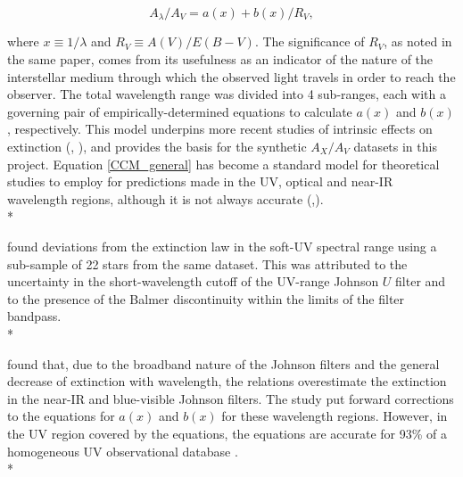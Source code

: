 \documentclass[12pt, a4paper]{report}
\begin{document}
\begin{equation}
A_{\lambda}/A_{V} = a(x) + b(x)/R_{V},
\label{CCM_general}
\end{equation}

where $x \equiv 1/\lambda$ and $R_{V} \equiv A(V)/E(B-V)$. The significance of $R_{V}$, as noted in the same paper, comes from its usefulness as an indicator of the nature of the interstellar medium through which the observed light travels in order to reach the observer. The total wavelength range was divided into 4 sub-ranges, each with a governing pair of empirically-determined equations to calculate $a(x)$ and $b(x)$, respectively. This model underpins more recent studies of intrinsic effects on extinction (\cite{2008PASP..120..583G}, \cite{2018MNRAS.479L.102C}), and provides the basis for the synthetic $A_{X}/A_{V}$ datasets in this project. Equation \ref{CCM_general} has become a standard model for theoretical studies to employ for predictions made in the UV, optical and near-IR wavelength regions, although it is not always accurate (\cite{1994ApJ...422..158O},\cite{1999PASP..111...63F}). \\*

\cite{1994ApJ...422..158O} found deviations from the \cite{1985ApJ...288..618R} extinction law in the soft-UV spectral range using a sub-sample of 22 stars from the same dataset. This was attributed to the uncertainty in the short-wavelength cutoff of the UV-range Johnson $U$ filter and to the presence of the Balmer discontinuity within the limits of the filter bandpass.\\*

\cite{1999PASP..111...63F} found that, due to the broadband nature of the Johnson filters and the general decrease of extinction with wavelength, the \cite{1989ApJ...345..245C} relations overestimate the extinction in the near-IR and blue-visible Johnson filters. The study put forward corrections to the equations for $a(x)$ and $b(x)$ for these wavelength regions. However, in the UV region covered by  the \cite{1989ApJ...345..245C} equations, the equations are accurate for 93\% of a homogeneous UV observational database \citep{2004ApJ...616..912V}.\\*
\end{document}
